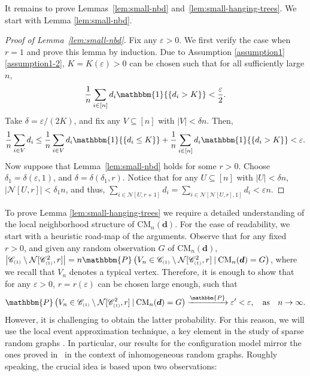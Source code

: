 \documentclass[11pt,a4paper, reqno]{article}
\newcommand\given[1][]{\:#1\vert\:}
\numberwithin{equation}{section}
\numberwithin{equation}{section}
\def\sss{\scriptscriptstyle}
\newcommand{\prob}[1]{\ensuremath{\mathbbm{P}\left(#1\right)}}
\newcommand{\ind}[1]{\ensuremath{\mathbbm{1}{\left\{#1\right\}}}}
\newcommand{\pto}{\ensuremath{\xrightarrow{\mathbbm{P}}}}
\newcommand{\1}{\ensuremath{\mathbbm{1}}}
\newcommand{\CM}{\ensuremath{\mathrm{CM}_n(\boldsymbol{d})}}
\numberwithin{equation}{section}
\numberwithin{theorem}{section}
\begin{document}
It remains to prove Lemmas~\ref{lem:small-nbd} and~\ref{lem:small-hanging-trees}. We start with Lemma \ref{lem:small-nbd}. 
\begin{proof}[Proof of Lemma~\ref{lem:small-nbd}]
Fix any $\varepsilon>0$.
We first verify the case when $r=1$ and prove this lemma by induction.
Due to Assumption \ref{assumption1}\ref{assumption1-2}, $K=K(\varepsilon)>0$ can be chosen such that for all sufficiently large $n$,
 \begin{equation}
 \frac{1}{n}\sum_{i\in [n]}d_i\ind{d_i>K} < \frac{\varepsilon}{2}.
 \end{equation} 
 Take $\delta = \varepsilon/ (2K)$, and fix any $V\subseteq [n]$ with $|V|< \delta n$. Then,
 \begin{equation}
  \frac{1}{n}\sum_{i\in V}d_i \leq \frac{1}{n} \sum_{i\in V}d_i\ind{d_i\leq K}+ \frac{1}{n}\sum_{i\in [n]}d_i\ind{d_i>K} < \varepsilon.
 \end{equation}
Now suppose that Lemma~\ref{lem:small-nbd} holds for some $r>0$.
Choose $\delta_1=\delta(\varepsilon,1)$, and $\delta = \delta(\delta_1,r)$. 
Notice that for any $U\subseteq [n]$ with $|U|<\delta n$,
 $|\mathcal{N}[U,r]|<\delta_1 n$, and thus, 
 $\sum_{i\in \mathcal{N}[U,r+1]}d_i=\sum_{i\in \mathcal{N}[\mathcal{N}[U,r],1]}d_i <\varepsilon n $.
\end{proof}
To prove Lemma \ref{lem:small-hanging-trees} we require a detailed understanding of the local neighborhood structure of $\CM$. 
For the ease of readability, we start with a heuristic road-map of the arguments. 
Observe that for any fixed $r>0$, and given any random observation $G$ of $\CM$, $\left|\mathscr{C}_{\sss (1)}\setminus\mathcal{N}[\mathscr{C}_{\sss (1)}^2,r]\right| = n\prob{V_n\in \mathscr{C}_{\sss (1)}\setminus\mathcal{N}[\mathscr{C}_{\sss (1)}^2,r]\given \CM=G}$, where we recall that $V_n$ denotes a typical vertex.
Therefore, it is enough to show that for any $\varepsilon>0$,
$r= r(\varepsilon)$ can be chosen large enough, such that 
$$\prob{V_n\in \mathscr{C}_{\sss (1)}\setminus\mathcal{N}[\mathscr{C}_{\sss (1)}^2,r]\given \CM= G}\pto \varepsilon'<\varepsilon, \quad \text{as}\quad n\to\infty.$$
However, it is challenging to obtain the latter probability.
For this reason, we will use the local event approximation technique, a key element in the study of sparse random graphs \cite{RGCN1,RGCN2,JLR00,BJM07,J08,BJR07}. 
In particular, our results for the configuration model mirror the ones proved in~\cite{BJR07} in the context of inhomogeneous random graphs.
Roughly speaking, the crucial idea is based upon two observations:
\end{document}
